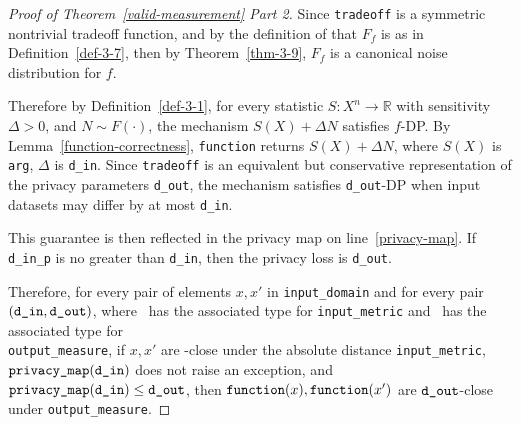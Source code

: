 \documentclass{article}
\begin{document}
\begin{proof}[Proof of Theorem~\ref{valid-measurement} Part 2]
Since \texttt{tradeoff} is a symmetric nontrivial tradeoff function, 
and by the definition of  that $F_f$ is as in Definition~\ref{def-3-7},
then by Theorem~\ref{thm-3-9}, $F_f$ is a canonical noise distribution for $f$.

Therefore by Definition~\ref{def-3-1},
for every statistic $S: X^n\rightarrow \mathbb{R}$ with sensitivity $\Delta>0$, and $N\sim F(\cdot)$, 
the mechanism $S(X) + \Delta N$ satisfies $f$-DP.
By Lemma~\ref{function-correctness}, \texttt{function} returns $S(X) + \Delta N$, where $S(X)$ is \texttt{arg}, $\Delta$ is \texttt{d\_in}.
Since \texttt{tradeoff} is an equivalent but conservative representation of the privacy parameters \texttt{d\_out},
the mechanism satisfies \texttt{d\_out}-DP when input datasets may differ by at most \texttt{d\_in}.

This guarantee is then reflected in the privacy map on line~\ref{privacy-map}.
If \texttt{d\_in\_p} is no greater than \texttt{d\_in}, then the privacy loss is \texttt{d\_out}.

Therefore, for every pair of elements $x, x'$ in \texttt{input\_domain} and for every pair $(\texttt{d\_in}, \texttt{d\_out})$,
where \din\ has the associated type for \texttt{input\_metric} and \dout\ has the associated type for \\ \texttt{output\_measure},
if $x, x'$ are \din-close under the absolute distance \texttt{input\_metric}, $\texttt{privacy\_map}(\texttt{d\_in})$ does not raise an exception,
and $\texttt{privacy\_map}(\texttt{d\_in}) \leq \texttt{d\_out}$,
then $\texttt{function}(x), \texttt{function}(x')$ are $\texttt{d\_out}$-close under \texttt{output\_measure}.

\end{proof}
\printbibliography
\end{document}
